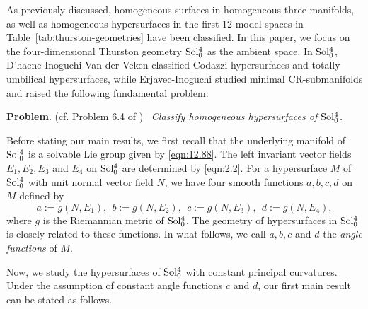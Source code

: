 \documentclass[reqno]{amsart}%
\theoremstyle{definition}
\numberwithin{equation}{section}
\begin{document}
	As previously discussed, homogeneous surfaces in homogeneous three-manifolds, as well as homogeneous hypersurfaces in the first $12$ model spaces in Table~\ref{tab:thurston-geometries} have been classified.
	In this paper, we focus on the four-dimensional Thurston geometry ${\rm Sol_0^4}$ as the ambient space.
	In ${\rm Sol_0^4}$, D'haene-Inoguchi-Van der Veken \cite{DIV} classified Codazzi hypersurfaces and
	totally umbilical hypersurfaces, while Erjavec-Inoguchi \cite{EI2} studied minimal
	CR-submanifolds and raised the following fundamental problem:
	
	\vskip1mm\noindent
	{\bf Problem}. (cf. Problem 6.4 of \cite{EI2}) \ {\it Classify homogeneous hypersurfaces of ${\rm Sol_0^4}$.}
	\vskip1mm
	
	Before stating our main results, we first recall that the underlying manifold of ${\rm Sol_0^4}$ is a solvable Lie group given by \eqref{eqn:12.88}.
	The left invariant vector fields $E_1,E_2,E_3$ and $E_4$ on ${\rm Sol_0^4}$ are determined by  \eqref{eqn:2.2}. For a hypersurface $M$ of ${\rm Sol_0^4}$ with unit normal vector field $N$,
	we have four smooth functions $a, b, c, d$ on $M$ defined by
	$$
	a:=g(N,E_1), \ \ b:=g(N,E_2), \ \ c:=g(N,E_3), \ \ d:=g(N,E_4),
	$$
	where $g$ is the Riemannian metric of ${\rm Sol_0^4}$. The geometry of hypersurfaces in ${\rm Sol_0^4}$
	is closely related to these functions. In what follows, we call $a,b,c$ and $d$ the
	{\it angle functions} of $M$.
	
	Now, we study the hypersurfaces of ${\rm Sol_0^4}$ with constant principal curvatures.
	Under the assumption of constant angle functions $c$ and $d$,
	our first main result can be stated as follows.
	
\end{document}
